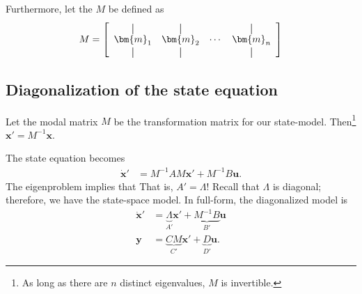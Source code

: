\documentclass[dynamic_systems.tex]{subfiles}
\begin{document}
Furthermore, let the  $M$ be defined as
\newcommand*{\vertbar}{\rule[-1ex]{0.5pt}{2.5ex}}
\newcommand*{\horzbar}{\rule[.5ex]{2.5ex}{0.5pt}}
\begin{align}
M = 
\left[
\begin{array}{cccc}
  \vertbar & \vertbar &        & \vertbar \\
  \bm{m}_{1}    & \bm{m}_{2}    & \cdots & \bm{m}_{n}    \\
  \vertbar & \vertbar &        & \vertbar 
\end{array}
\right]
\end{align}

\subsection{Diagonalization of the state equation}
\tags{}

Let the modal matrix $M$ be the transformation matrix for our state-model.
Then\footnote{As long as there are $n$ distinct eigenvalues, $M$ is invertible.} $\bm{x}' = M^{-1} \bm{x}$.
\tags{}

The state equation becomes
\begin{align}
	\dot{\bm{x}}' &= 
	M^{-1} A M \bm{x}' +
	M^{-1} B \bm{u}.
\end{align}
The eigenproblem implies that
\tags{}
That is, $A' = \Lambda$!
Recall that $\Lambda$ is diagonal; therefore, we have  the state-space model.
In full-form, the diagonalized model is
\tags{}
\begin{subequations}\label{eq:diagonalized_state_space}
\begin{align}
	\dot{\bm{x}}' &= 
	\underbrace{\Lambda}_{A'} \bm{x}' +
	\underbrace{M^{-1} B}_{B'} \bm{u} \\
	\bm{y} &=
	\underbrace{C M}_{C'} \bm{x}' +
	\underbrace{D}_{D'} \bm{u}.
\end{align}
\end{subequations}
\end{document}
